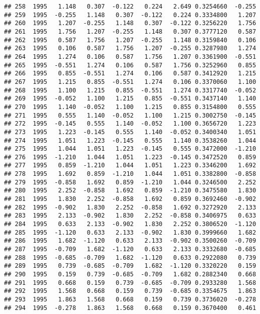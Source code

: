 \documentclass[]{article}
\begin{document}
\begin{verbatim}
## 258  1995   1.148   0.307  -0.122   0.224   2.649 0.3254660  -0.255
## 259  1995  -0.255   1.148   0.307  -0.122   0.224 0.3334800   1.207
## 260  1995   1.207  -0.255   1.148   0.307  -0.122 0.3256220   1.756
## 261  1995   1.756   1.207  -0.255   1.148   0.307 0.3777120   0.587
## 262  1995   0.587   1.756   1.207  -0.255   1.148 0.3159840   0.106
## 263  1995   0.106   0.587   1.756   1.207  -0.255 0.3287980   1.274
## 264  1995   1.274   0.106   0.587   1.756   1.207 0.3361900  -0.551
## 265  1995  -0.551   1.274   0.106   0.587   1.756 0.3252960   0.855
## 266  1995   0.855  -0.551   1.274   0.106   0.587 0.3412920   1.215
## 267  1995   1.215   0.855  -0.551   1.274   0.106 0.3370060   1.100
## 268  1995   1.100   1.215   0.855  -0.551   1.274 0.3317740  -0.052
## 269  1995  -0.052   1.100   1.215   0.855  -0.551 0.3437140   1.140
## 270  1995   1.140  -0.052   1.100   1.215   0.855 0.3154800   0.555
## 271  1995   0.555   1.140  -0.052   1.100   1.215 0.3002750  -0.145
## 272  1995  -0.145   0.555   1.140  -0.052   1.100 0.3656720   1.223
## 273  1995   1.223  -0.145   0.555   1.140  -0.052 0.3400340   1.051
## 274  1995   1.051   1.223  -0.145   0.555   1.140 0.3538260   1.044
## 275  1995   1.044   1.051   1.223  -0.145   0.555 0.3472000  -1.210
## 276  1995  -1.210   1.044   1.051   1.223  -0.145 0.3472520   0.859
## 277  1995   0.859  -1.210   1.044   1.051   1.223 0.3346200   1.692
## 278  1995   1.692   0.859  -1.210   1.044   1.051 0.3382800  -0.858
## 279  1995  -0.858   1.692   0.859  -1.210   1.044 0.3246500   2.252
## 280  1995   2.252  -0.858   1.692   0.859  -1.210 0.3475580   1.830
## 281  1995   1.830   2.252  -0.858   1.692   0.859 0.3692460  -0.902
## 282  1995  -0.902   1.830   2.252  -0.858   1.692 0.3272920   2.133
## 283  1995   2.133  -0.902   1.830   2.252  -0.858 0.3406975   0.633
## 284  1995   0.633   2.133  -0.902   1.830   2.252 0.3806520  -1.120
## 285  1995  -1.120   0.633   2.133  -0.902   1.830 0.3999660   1.682
## 286  1995   1.682  -1.120   0.633   2.133  -0.902 0.3500260  -0.709
## 287  1995  -0.709   1.682  -1.120   0.633   2.133 0.3332680  -0.685
## 288  1995  -0.685  -0.709   1.682  -1.120   0.633 0.2922080   0.739
## 289  1995   0.739  -0.685  -0.709   1.682  -1.120 0.3320220   0.159
## 290  1995   0.159   0.739  -0.685  -0.709   1.682 0.2882340   0.668
## 291  1995   0.668   0.159   0.739  -0.685  -0.709 0.2933280   1.568
## 292  1995   1.568   0.668   0.159   0.739  -0.685 0.3354675   1.863
## 293  1995   1.863   1.568   0.668   0.159   0.739 0.3736020  -0.278
## 294  1995  -0.278   1.863   1.568   0.668   0.159 0.3670400   0.461

\end{verbatim}
\end{document}
